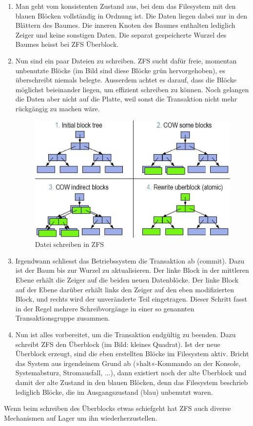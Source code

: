 \begin{enumerate}
	\item Man geht vom konsistenten Zustand aus, bei dem das Filesystem mit den blauen Blöcken vollständig in Ordnung ist. Die Daten liegen dabei nur in den Blättern des Baumes. Die inneren Knoten des Baumes enthalten lediglich Zeiger und keine sonstigen Daten. Die separat gespeicherte Wurzel des Baumes heisst bei ZFS Überblock.
	\item Nun sind ein paar Dateien zu schreiben. ZFS sucht dafür freie, momentan unbenutzte Blöcke (im Bild sind diese Blöcke grün hervorgehoben), es überschreibt niemals belegte. Ausserdem achtet es darauf, dass die Blöcke möglichst beieinander liegen, um effizient schreiben zu können. Noch gelangen die Daten aber nicht auf die Platte, weil sonst die Transaktion nicht mehr rückgängig zu machen wäre.
	\begin{figure}[h!]
		\centering
		\includegraphics[width=0.7\linewidth]{fig/write-file-zfs}
		\caption{Datei schreiben in ZFS}
		\label{fig:write-file-zfs}
	\end{figure}
	\item Irgendwann schliesst das Betriebssystem die Transaktion ab (commit). Dazu ist der Baum bis zur Wurzel zu aktualisieren. Der linke Block in der mittleren Ebene erhält die Zeiger auf die beiden neuen Datenblöcke. Der linke Block auf der Ebene darüber erhält links den Zeiger auf den eben modifizierten Block, und rechts wird der unveränderte Teil eingetragen. Dieser Schritt fasst in der Regel mehrere Schreibvorgänge in einer so genannten Transaktionsgruppe zusammen.
	\item Nun ist alles vorbereitet, um die Transaktion endgültig zu beenden. Dazu schreibt ZFS den Überblock (im Bild: kleines Quadrat). Ist der neue Überblock erzeugt, sind die eben erstellten Blöcke im Filesystem aktiv. Bricht das System aus irgendeinem Grund ab (»halt«-Kommando an der Konsole, Systemabsturz, Stromausfall, ...), dann existiert noch der alte Überblock und damit der alte Zustand in den blauen Blöcken, denn das Filesystem beschrieb lediglich Blöcke, die im Ausgangszustand (blau) unbenutzt waren.
\end{enumerate}
Wenn beim schreiben des Überblocks etwas schiefgeht hat ZFS auch diverse Mechanismen auf Lager um ihn wiederherzustellen.

